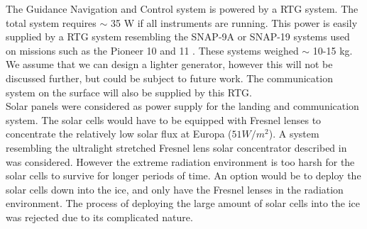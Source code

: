 
The Guidance Navigation and Control system is powered by a RTG system. The total system requires $\sim$ 35 W if all instruments are running. This power is easily supplied by a RTG system resembling the SNAP-9A or SNAP-19 systems used on missions such as the Pioneer 10 and 11 \cite{wikirtg}. These systems weighed $\sim$ 10-15 kg. We assume that we can design a lighter generator, however this will not be discussed further, but could be subject to future work. The communication system on the surface will also be supplied by this RTG. \\

Solar panels were considered as power supply for the landing and communication system. The solar cells would have to be equipped with Fresnel lenses to concentrate the relatively low solar flux at Europa ($51 W/m^2$). A system resembling the ultralight stretched Fresnel lens solar concentrator described in \cite{fresnel} was considered. However the extreme radiation environment is too harsh for the solar cells to survive for longer periods of time. An option would be to deploy the solar cells down into the ice, and only have the Fresnel lenses in the radiation environment. The process of deploying the large amount of solar cells into the ice was rejected due to its complicated nature. 




